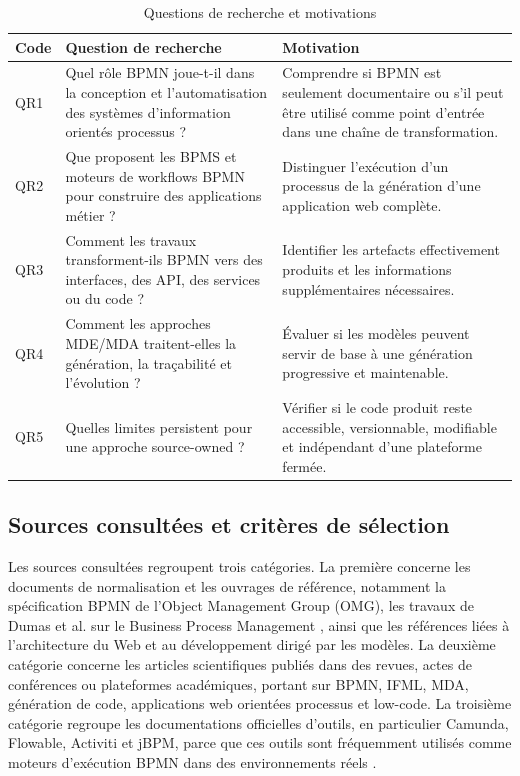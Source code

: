 \begin{table}[H]
\caption{Questions de recherche et motivations}
\label{tab:questions-recherche-motivations}
\centering
\footnotesize
\renewcommand{\arraystretch}{1.2}
\begin{tabular}{|p{1.2cm}|p{6.0cm}|p{6.0cm}|}
\hline
\textbf{Code} & \textbf{Question de recherche} & \textbf{Motivation} \\
\hline
QR1 & Quel rôle BPMN joue-t-il dans la conception et l'automatisation
des systèmes d'information orientés processus ? & Comprendre si BPMN est
seulement documentaire ou s'il peut être utilisé comme point d'entrée
dans une chaîne de transformation. \\
\hline
QR2 & Que proposent les BPMS et moteurs de workflows BPMN pour
construire des applications métier ? & Distinguer l'exécution d'un
processus de la génération d'une application web complète. \\
\hline
QR3 & Comment les travaux transforment-ils BPMN vers des interfaces, des
API, des services ou du code ? & Identifier les artefacts effectivement
produits et les informations supplémentaires nécessaires. \\
\hline
QR4 & Comment les approches MDE/MDA traitent-elles la génération, la
traçabilité et l'évolution ? & Évaluer si les modèles peuvent servir de
base à une génération progressive et maintenable. \\
\hline
QR5 & Quelles limites persistent pour une approche source-owned ? &
Vérifier si le code produit reste accessible, versionnable, modifiable
et indépendant d'une plateforme fermée. \\
\hline
\end{tabular}
\end{table}

\subsection{Sources consultées et critères de sélection}

Les sources consultées regroupent trois catégories. La première concerne
les documents de normalisation et les ouvrages de référence, notamment
la spécification BPMN de l'Object Management Group (OMG), les travaux de
Dumas et al. sur le Business Process Management \cite{dumas2018bpm}, ainsi que les
références liées à l'architecture du Web et au développement dirigé par
les modèles. La deuxième catégorie concerne les articles scientifiques
publiés dans des revues, actes de conférences ou plateformes
académiques, portant sur BPMN, IFML, MDA, génération de code,
applications web orientées processus et low-code. La troisième catégorie
regroupe les documentations officielles d'outils, en particulier
Camunda, Flowable, Activiti et jBPM, parce que ces outils sont
fréquemment utilisés comme moteurs d'exécution BPMN dans des
environnements réels \cite{camunda2026modeler,flowable2026bpmn,jbpm2026docs,activiti2026docs}.

